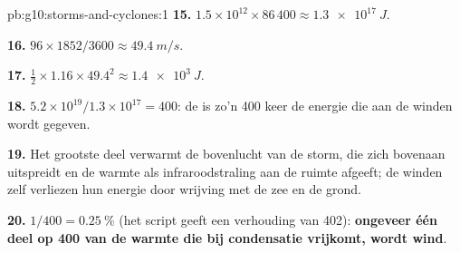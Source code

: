 \begin{solution}{pb:g10:storms-and-cyclones:1}
\textbf{15.} $1.5\times10^{12} \times 86\,400 \approx \qty{1.3e17}{J}$.

\textbf{16.} $96 \times 1852/3600 \approx \qty{49.4}{m/s}$.

\textbf{17.} $\frac12 \times 1.16 \times 49.4^2 \approx \qty{1.4e3}{J}$.

\textbf{18.} $5.2\times10^{19}/1.3\times10^{17} = 400$: de  is
zo'n 400 keer de energie die aan de winden wordt gegeven.

\textbf{19.} Het grootste deel verwarmt de bovenlucht van de storm, die zich
bovenaan uitspreidt en de warmte als infraroodstraling aan de ruimte afgeeft;
de winden zelf verliezen hun energie door wrijving met de zee en de grond.

\textbf{20.} $1/400 = \qty{0.25}{\percent}$ (het script geeft een verhouding van
402): \textbf{ongeveer één deel op 400 van de warmte die bij condensatie
vrijkomt, wordt wind}.
\end{solution}
